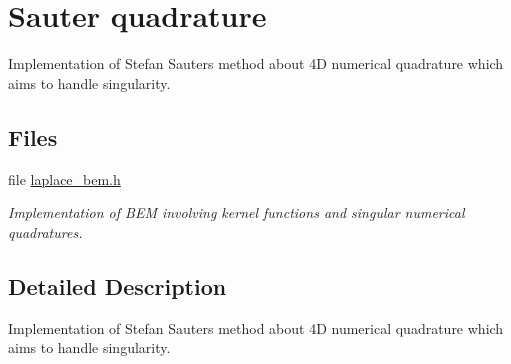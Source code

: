 \hypertarget{group__sauter__quadrature}{}\section{Sauter quadrature}
\label{group__sauter__quadrature}


Implementation of Stefan Sauter\textquotesingle{}s method about 4D numerical quadrature which aims to handle singularity.  


\subsection*{Files}
\begin{DoxyCompactItemize}
\item 
file \hyperlink{laplace__bem_8h}{laplace\+\_\+bem.\+h}
\begin{DoxyCompactList}\small\item\em Implementation of B\+EM involving kernel functions and singular numerical quadratures. \end{DoxyCompactList}\end{DoxyCompactItemize}


\subsection{Detailed Description}
Implementation of Stefan Sauter\textquotesingle{}s method about 4D numerical quadrature which aims to handle singularity. 


